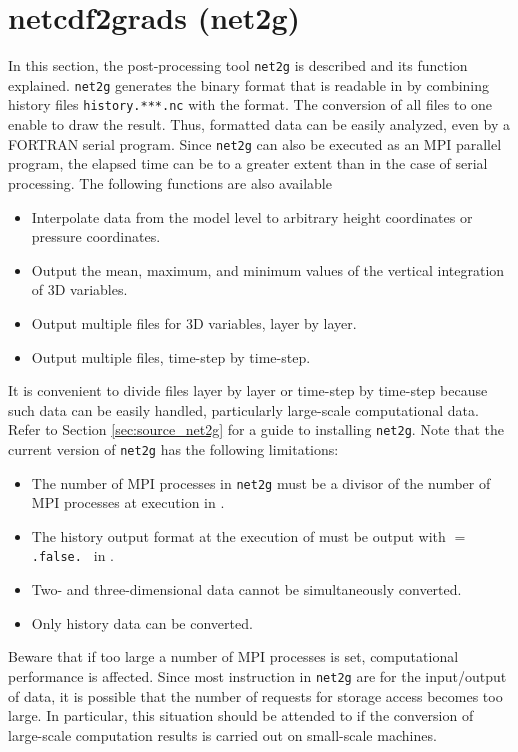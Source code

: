 \section{netcdf2grads (net2g)} \label{sec:net2g}

In this section, the post-processing tool \verb|net2g| is described and its function explained. \verb|net2g| generates the binary format that is readable in \grads by combining history files \verb|history.***.nc| with the \netcdf format.
The conversion of all files to one enable \grads to draw the result.
Thus, formatted data can be easily analyzed, even by a FORTRAN serial program.
Since \verb|net2g| can also be executed as an MPI parallel program,
the elapsed time can be to a greater extent than in the case of serial processing. The following functions are also available
\begin{itemize}
 \item Interpolate data from the model level to arbitrary height coordinates or pressure coordinates.
 \item Output the mean, maximum, and minimum values of the vertical integration of 3D variables.
 \item Output multiple files for 3D variables, layer by layer.
 \item Output multiple files, time-step by time-step.
\end{itemize}


It is convenient to divide files layer by layer or time-step by time-step because such data can be easily handled, particularly large-scale computational data. Refer to Section \ref{sec:source_net2g} for a guide to installing \verb|net2g|.
Note that the current version of \verb|net2g| has the following limitations:
\begin{itemize}
\item The number of MPI processes in \verb|net2g| must be a divisor of the number of MPI processes at execution in \scalerm.
\item The history output format at the execution of \scalerm must be output with    $=$ \verb|.false. | in .
\item Two- and three-dimensional data cannot be simultaneously converted.
\item Only history data can be converted.
\end{itemize}
Beware that if too large a number of MPI processes is set, computational performance is affected. Since most instruction in \verb|net2g| are for the input/output of data, it is possible that the number of requests for storage access becomes too large. In particular, this situation should be attended to if the conversion of large-scale computation results is carried out on small-scale machines.

